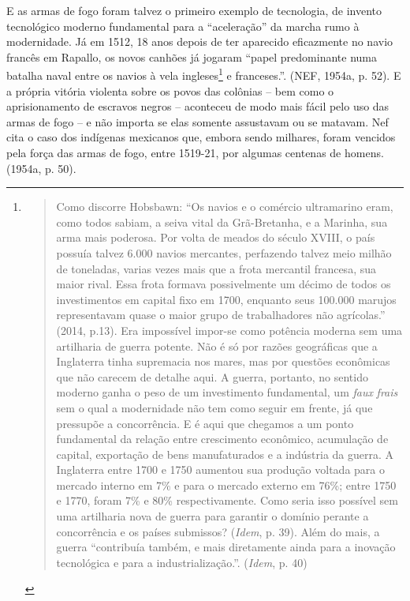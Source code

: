 E as armas de fogo foram talvez o primeiro exemplo de tecnologia, de
invento tecnológico moderno fundamental para a ``aceleração'' da marcha
rumo à modernidade. Já em 1512, 18 anos depois de ter aparecido
eficazmente no navio francês em Rapallo, os novos canhões já jogaram
``papel predominante numa batalha naval entre os navios à vela
ingleses\footnote{\begin{quote}
  Como discorre Hobsbawn: ``Os navios e o comércio ultramarino eram,
  como todos sabiam, a seiva vital da Grã-Bretanha, e a Marinha, sua
  arma mais poderosa. Por volta de meados do século XVIII, o país
  possuía talvez 6.000 navios mercantes, perfazendo talvez meio milhão
  de toneladas, varias vezes mais que a frota mercantil francesa, sua
  maior rival. Essa frota formava possivelmente um décimo de todos os
  investimentos em capital fixo em 1700, enquanto seus 100.000 marujos
  representavam quase o maior grupo de trabalhadores não agrícolas.''
  (2014, p.13). Era impossível impor-se como potência moderna sem uma
  artilharia de guerra potente. Não é só por razões geográficas que a
  Inglaterra tinha supremacia nos mares, mas por questões econômicas que
  não carecem de detalhe aqui. A guerra, portanto, no sentido moderno
  ganha o peso de um investimento fundamental, um \emph{faux}
  \emph{frais} sem o qual a modernidade não tem como seguir em frente,
  já que pressupõe a concorrência. E é aqui que chegamos a um ponto
  fundamental da relação entre crescimento econômico, acumulação de
  capital, exportação de bens manufaturados e a indústria da guerra. A
  Inglaterra entre 1700 e 1750 aumentou sua produção voltada para o
  mercado interno em 7\% e para o mercado externo em 76\%; entre 1750 e
  1770, foram 7\% e 80\% respectivamente. Como seria isso possível sem
  uma artilharia nova de guerra para garantir o domínio perante a
  concorrência e os países submissos? (\emph{Idem}, p. 39). Além do
  mais, a guerra ``contribuía também, e mais diretamente ainda para a
  inovação tecnológica e para a industrialização.''. (\emph{Idem}, p.
  40)
  \end{quote}} e franceses.''. (NEF, 1954a, p. 52). E a própria vitória
violenta sobre os povos das colônias -- bem como o aprisionamento de
escravos negros -- aconteceu de modo mais fácil pelo uso das armas de
fogo -- e não importa se elas somente assustavam ou se matavam. Nef cita
o caso dos indígenas mexicanos que, embora sendo milhares, foram
vencidos pela força das armas de fogo, entre 1519-21, por algumas
centenas de homens. (1954a, p. 50).

